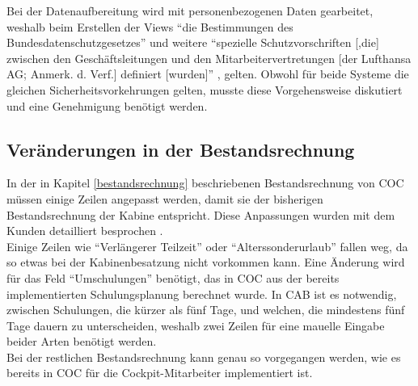 \documentclass [12pt, a4paper, oneside, titlepage, ngerman]{article}
\begin{document}
\noindent Bei der Datenaufbereitung wird mit personenbezogenen Daten gearbeitet, weshalb beim Erstellen der Views "`die Bestimmungen des Bundesdatenschutzgesetzes"' \cite[S.6]{CMS} und weitere "`spezielle Schutzvorschriften [,die] zwischen den Geschäftsleitungen und den Mitarbeitervertretungen [der Lufthansa AG; Anmerk. d. Verf.] definiert [wurden]"' \cite[S.6]{CMS}, gelten. Obwohl für beide Systeme die gleichen Sicherheitsvorkehrungen gelten, musste diese Vorgehensweise diskutiert und eine Genehmigung benötigt werden. 

\subsection{Veränderungen in der Bestandsrechnung} %
In der in Kapitel \ref{bestandsrechnung} beschriebenen Bestandsrechnung von \ac{COC} müssen einige Zeilen angepasst werden, damit sie der bisherigen Bestandsrechnung der Kabine entspricht. Diese Anpassungen wurden mit dem Kunden detailliert besprochen \cite[vgl.][]{bestanddet}. \\
Einige Zeilen wie "`Verlängerer Teilzeit"' oder "`Alterssonderurlaub"' fallen weg, da so etwas bei der Kabinenbesatzung nicht vorkommen kann. Eine Änderung wird für das Feld "`Umschulungen"' benötigt, das in \ac{COC} aus der bereits implementierten Schulungsplanung berechnet wurde. In \ac{CAB} ist es notwendig, zwischen Schulungen, die kürzer als fünf Tage, und welchen, die mindestens fünf Tage dauern zu unterscheiden, weshalb zwei Zeilen für eine mauelle Eingabe beider Arten benötigt werden. \\ %
Bei der restlichen Bestandsrechnung kann genau so vorgegangen werden, wie es bereits in \ac{COC} für die Cockpit-Mitarbeiter implementiert ist.

\end{document}
